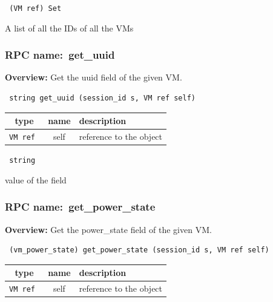 \vspace{0.3cm}

{\tt 
(VM ref) Set
}


A list of all the IDs of all the VMs
\vspace{0.3cm}
\vspace{0.3cm}
\vspace{0.3cm}
\subsubsection{RPC name:~get\_uuid}

{\bf Overview:} 
Get the uuid field of the given VM.

\begin{verbatim} string get_uuid (session_id s, VM ref self)\end{verbatim}



 
\vspace{0.3cm}
\begin{tabular}{|c|c|p{7cm}|}
 \hline
{\bf type} & {\bf name} & {\bf description} \\ \hline
{\tt VM ref } & self & reference to the object \\ \hline 

\end{tabular}

\vspace{0.3cm}

{\tt 
string
}


value of the field
\vspace{0.3cm}
\vspace{0.3cm}
\vspace{0.3cm}
\subsubsection{RPC name:~get\_power\_state}

{\bf Overview:} 
Get the power\_state field of the given VM.

\begin{verbatim} (vm_power_state) get_power_state (session_id s, VM ref self)\end{verbatim}



 
\vspace{0.3cm}
\begin{tabular}{|c|c|p{7cm}|}
 \hline
{\bf type} & {\bf name} & {\bf description} \\ \hline
{\tt VM ref } & self & reference to the object \\ \hline 

\end{tabular}

